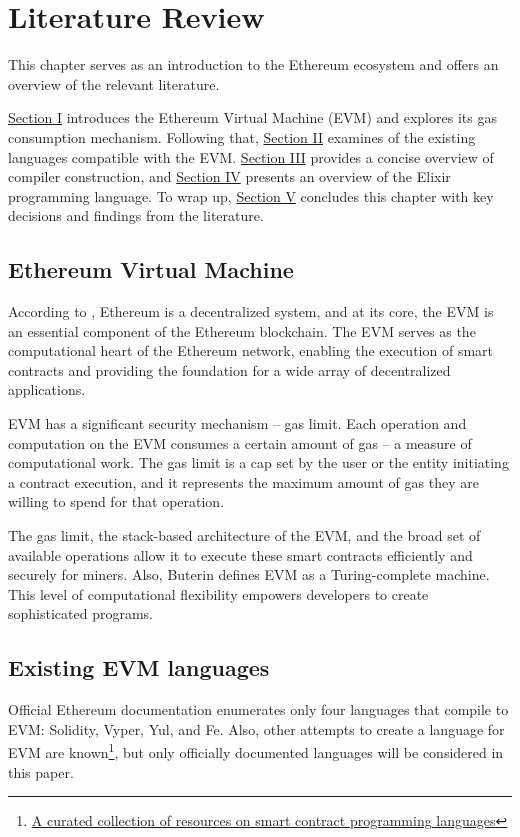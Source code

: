\chapter{Literature Review}
\label{chap:lr}

This chapter serves as an introduction to the Ethereum ecosystem and offers an overview of the relevant literature.

\hyperref[sec:evm]{Section I} introduces the Ethereum Virtual Machine (EVM) and explores its gas consumption mechanism. Following that, \hyperref[sec:langs]{Section II} examines of the existing languages compatible with the EVM. \hyperref[sec:cc]{Section III} provides a concise overview of compiler construction, and \hyperref[sec:ex]{Section IV} presents an overview of the Elixir programming language. To wrap up, \hyperref[sec:conc]{Section V} concludes this chapter with key decisions and findings from the literature.

\section{Ethereum Virtual Machine}
\label{sec:evm}
According to \cite{EthereumWhitepaper}, Ethereum is a decentralized system, and at its core, the EVM is an essential component of the Ethereum blockchain. The EVM serves as the computational heart of the Ethereum network, enabling the execution of smart contracts and providing the foundation for a wide array of decentralized applications.

EVM has a significant security mechanism -- gas limit. Each operation and computation on the EVM consumes a certain amount of gas -- a measure of computational work. The gas limit is a cap set by the user or the entity initiating a contract execution, and it represents the maximum amount of gas they are willing to spend for that operation.

The gas limit, the stack-based architecture of the EVM, and the broad set of available operations allow it to  execute these smart contracts efficiently and securely for miners. Also, Buterin \cite{EthereumWhitepaper} defines EVM as a Turing-complete machine. This level of computational flexibility empowers developers to create sophisticated programs.

\section{Existing EVM languages}
\label{sec:langs}
Official Ethereum documentation \cite{OfficialEthereumLanguages} enumerates only four languages that compile to EVM: Solidity, Vyper, Yul, and Fe. Also, other attempts to create a language for EVM are known\footnote{\href{https://github.com/s-tikhomirov/smart-contract-languages}{A curated collection of resources on smart contract programming languages}}, but only officially documented languages will be considered in this paper.

